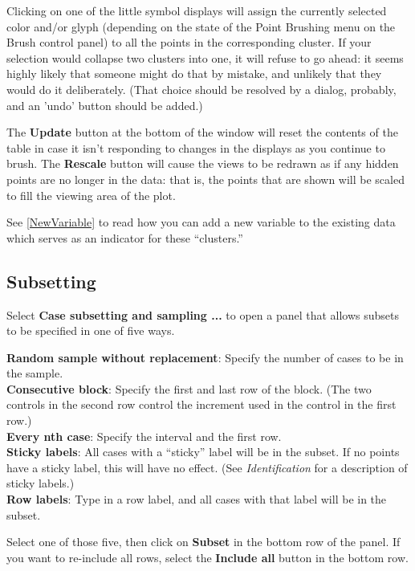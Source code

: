 \documentclass[11pt]{article}
\begin{document}
Clicking on one of the little symbol displays will assign the
currently selected color and/or glyph (depending on the state of the
Point Brushing menu on the Brush control panel) to all the points in
the corresponding cluster.  If your selection would collapse two
clusters into one, it will refuse to go ahead:  it seems highly
likely that someone might do that by mistake, and unlikely that they
would do it deliberately.  (That choice should be resolved by a
dialog, probably, and an 'undo' button should be added.)

The {\bf Update} button at the bottom of the window will reset the
contents of the table in case it isn't responding to changes in the
displays as you continue to brush.  The {\bf Rescale} button will cause
the views to be redrawn as if any hidden points are no longer in the
data:  that is, the points that are shown will be scaled to fill the
viewing area of the plot.

See \ref{NewVariable} to read how you can add a new variable to the
existing data which serves as an indicator for these ``clusters.''

\subsection{Subsetting}

Select {\bf Case subsetting and sampling ...} to open a panel
that allows subsets to be specified in one of five ways.

{\bf Random sample without replacement}:  Specify the number of
     cases to be in the sample.
\\{\bf Consecutive block}:  Specify the first and last row of the block.
     (The two controls in the second row control the increment used
     in the control in the first row.)
\\{\bf Every nth case}:  Specify the interval and the first row.
\\{\bf Sticky labels}:  All cases with a ``sticky'' label will
  be in the subset.  If no points have a sticky label, this
  will have no effect. (See {\em Identification} for a description
  of sticky labels.)
\\{\bf Row labels}: Type in a row label, and all cases with that
  label will be in the subset.

Select one of those five, then click on {\bf Subset} in the
bottom row of the panel.  If you want to re-include all rows, 
select the {\bf Include all} button in the bottom row.
\end{document}
